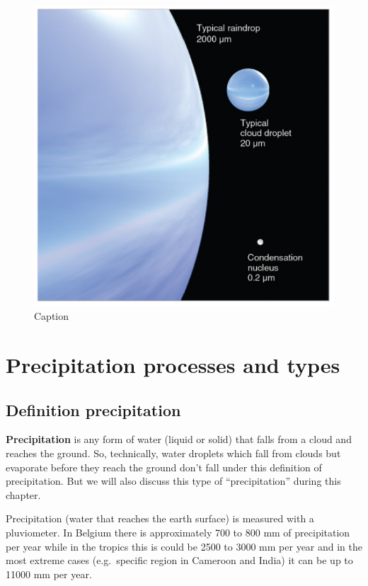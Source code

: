 \documentclass[12pt,oneside]{book}
\begin{document}
\begin{figure}

{\centering \includegraphics[width=0.9\linewidth]{figures/Figure323} 

}

\caption{Caption}\label{fig:Orographic3}
\end{figure}

\section{Precipitation processes and
types}\label{precipitation-processes-and-types}

\subsection{Definition precipitation}\label{definition-precipitation}

\textbf{Precipitation} is any form of water (liquid or solid) that falls
from a cloud and reaches the ground. So, technically, water droplets
which fall from clouds but evaporate before they reach the ground don't
fall under this definition of precipitation. But we will also discuss
this type of ``precipitation'' during this chapter.

Precipitation (water that reaches the earth surface) is measured with a
pluviometer. In Belgium there is approximately 700 to 800 mm of
precipitation per year while in the tropics this is could be 2500 to
3000 mm per year and in the most extreme cases (e.g.~specific region in
Cameroon and India) it can be up to 11000 mm per year.
\end{document}

